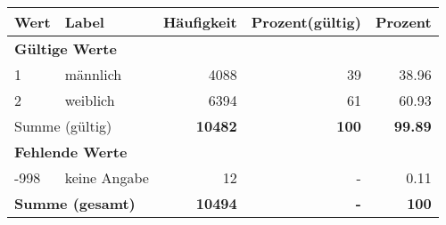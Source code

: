      \begin{longtable}{lXrrr}
     \toprule
     \textbf{Wert} & \textbf{Label} & \textbf{Häufigkeit} & \textbf{Prozent(gültig)} & \textbf{Prozent} \\
     \endhead
     \midrule
     \multicolumn{5}{l}{\textbf{Gültige Werte}}\\

     1 &
     \multicolumn{1}{X}{ männlich   } &


       \num{4088} &
       \num[round-mode=places,round-precision=2]{39} &
         \num[round-mode=places,round-precision=2]{38,96} \\

     2 &
     \multicolumn{1}{X}{ weiblich   } &


       \num{6394} &
       \num[round-mode=places,round-precision=2]{61} &
         \num[round-mode=places,round-precision=2]{60,93} \\
     \midrule
     \multicolumn{2}{l}{Summe (gültig)} &
       \textbf{\num{10482}} &
     \textbf{100} &
       \textbf{\num[round-mode=places,round-precision=2]{99,89}} \\
     \multicolumn{5}{l}{\textbf{Fehlende Werte}}\\
       -998 &
       keine Angabe &
         \num{12} &
        - &
         \num[round-mode=places,round-precision=2]{0,11} \\
     \midrule
     \multicolumn{2}{l}{\textbf{Summe (gesamt)}} &
          \textbf{\num{10494}} &
        \textbf{-} &
        \textbf{100} \\
     \bottomrule
     \end{longtable}
     
